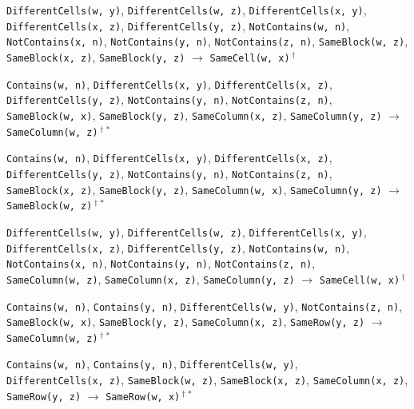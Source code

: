 \documentclass[11pt,a4paper]{article}
\theoremstyle{definition}
\theoremstyle{remark}
\begin{document}
{\begin{enumerate}[label={[\arabic*]},leftmargin=2.6em,itemsep=1pt]
  \item \texttt{DifferentCells(w,~y)}, \allowbreak \texttt{DifferentCells(w,~z)}, \allowbreak \texttt{DifferentCells(x,~y)}, \allowbreak \texttt{DifferentCells(x,~z)}, \allowbreak \texttt{DifferentCells(y,~z)}, \allowbreak \texttt{NotContains(w,~n)}, \allowbreak \texttt{NotContains(x,~n)}, \allowbreak \texttt{NotContains(y,~n)}, \allowbreak \texttt{NotContains(z,~n)}, \allowbreak \texttt{SameBlock(w,~z)}, \allowbreak \texttt{SameBlock(x,~z)}, \allowbreak \texttt{SameBlock(y,~z)} \;$\to$\; \texttt{SameCell(w,~x)}\,$^{\dagger}$
  \item \texttt{Contains(w,~n)}, \allowbreak \texttt{DifferentCells(x,~y)}, \allowbreak \texttt{DifferentCells(x,~z)}, \allowbreak \texttt{DifferentCells(y,~z)}, \allowbreak \texttt{NotContains(y,~n)}, \allowbreak \texttt{NotContains(z,~n)}, \allowbreak \texttt{SameBlock(w,~x)}, \allowbreak \texttt{SameBlock(y,~z)}, \allowbreak \texttt{SameColumn(x,~z)}, \allowbreak \texttt{SameColumn(y,~z)} \;$\to$\; \texttt{SameColumn(w,~z)}\,$^{\dagger}$\,$^{\ast}$
  \item \texttt{Contains(w,~n)}, \allowbreak \texttt{DifferentCells(x,~y)}, \allowbreak \texttt{DifferentCells(x,~z)}, \allowbreak \texttt{DifferentCells(y,~z)}, \allowbreak \texttt{NotContains(y,~n)}, \allowbreak \texttt{NotContains(z,~n)}, \allowbreak \texttt{SameBlock(x,~z)}, \allowbreak \texttt{SameBlock(y,~z)}, \allowbreak \texttt{SameColumn(w,~x)}, \allowbreak \texttt{SameColumn(y,~z)} \;$\to$\; \texttt{SameBlock(w,~z)}\,$^{\dagger}$\,$^{\ast}$
  \item \texttt{DifferentCells(w,~y)}, \allowbreak \texttt{DifferentCells(w,~z)}, \allowbreak \texttt{DifferentCells(x,~y)}, \allowbreak \texttt{DifferentCells(x,~z)}, \allowbreak \texttt{DifferentCells(y,~z)}, \allowbreak \texttt{NotContains(w,~n)}, \allowbreak \texttt{NotContains(x,~n)}, \allowbreak \texttt{NotContains(y,~n)}, \allowbreak \texttt{NotContains(z,~n)}, \allowbreak \texttt{SameColumn(w,~z)}, \allowbreak \texttt{SameColumn(x,~z)}, \allowbreak \texttt{SameColumn(y,~z)} \;$\to$\; \texttt{SameCell(w,~x)}\,$^{\dagger}$
  \item \texttt{Contains(w,~n)}, \allowbreak \texttt{Contains(y,~n)}, \allowbreak \texttt{DifferentCells(w,~y)}, \allowbreak \texttt{NotContains(z,~n)}, \allowbreak \texttt{SameBlock(w,~x)}, \allowbreak \texttt{SameBlock(y,~z)}, \allowbreak \texttt{SameColumn(x,~z)}, \allowbreak \texttt{SameRow(y,~z)} \;$\to$\; \texttt{SameColumn(w,~z)}\,$^{\dagger}$\,$^{\ast}$
  \item \texttt{Contains(w,~n)}, \allowbreak \texttt{Contains(y,~n)}, \allowbreak \texttt{DifferentCells(w,~y)}, \allowbreak \texttt{DifferentCells(x,~z)}, \allowbreak \texttt{SameBlock(w,~z)}, \allowbreak \texttt{SameBlock(x,~z)}, \allowbreak \texttt{SameColumn(x,~z)}, \allowbreak \texttt{SameRow(y,~z)} \;$\to$\; \texttt{SameRow(w,~x)}\,$^{\dagger}$\,$^{\ast}$

\end{enumerate}}
\end{document}

